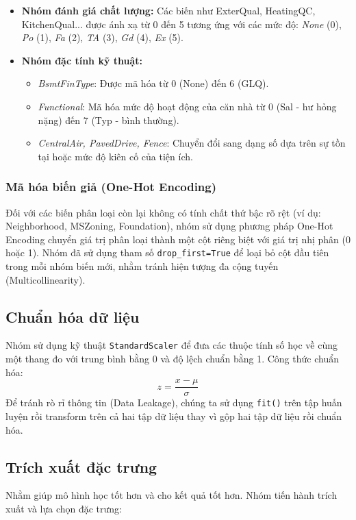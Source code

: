 \begin{itemize}
    \item[-] \textbf{Nhóm đánh giá chất lượng:} Các biến như ExterQual, HeatingQC, KitchenQual... được ánh xạ từ 0 đến 5 tương ứng với các mức độ: \textit{None} (0), \textit{Po} (1), \textit{Fa} (2), \textit{TA} (3), \textit{Gd} (4), \textit{Ex} (5).
    \item[-] \textbf{Nhóm đặc tính kỹ thuật:}
    \begin{itemize}
        \item[+] \textit{BsmtFinType}: Được mã hóa từ 0 (None) đến 6 (GLQ).
        \item[+] \textit{Functional}: Mã hóa mức độ hoạt động của căn nhà từ 0 (Sal - hư hỏng nặng) đến 7 (Typ - bình thường).
        \item[+] \textit{CentralAir, PavedDrive, Fence}: Chuyển đổi sang dạng số dựa trên sự tồn tại hoặc mức độ kiên cố của tiện ích.
    \end{itemize}
\end{itemize}

\subsubsection{Mã hóa biến giả (One-Hot Encoding)}
\indent Đối với các biến phân loại còn lại không có tính chất thứ bậc rõ rệt (ví dụ: Neighborhood, MSZoning, Foundation), nhóm sử dụng phương pháp One-Hot Encoding chuyển giá trị phân loại thành một cột riêng biệt với giá trị nhị phân (0 hoặc 1). Nhóm đã sử dụng tham số \texttt{drop\_first=True} để loại bỏ cột đầu tiên trong mỗi nhóm biến mới, nhằm tránh hiện tượng đa cộng tuyến (Multicollinearity).
\subsection{Chuẩn hóa dữ liệu}
\indent Nhóm sử dụng kỹ thuật \texttt{StandardScaler} để đưa các thuộc tính số học về cùng một thang đo với trung bình bằng 0 và độ lệch chuẩn bằng 1. Công thức chuẩn hóa:
\begin{equation}
z = \frac{x - \mu}{\sigma}
\end{equation}
Để tránh rò rỉ thông tin (Data Leakage), chúng ta sử dụng \texttt{fit()} trên tập huấn luyện rồi transform trên cả hai tập dữ liệu thay vì gộp hai tập dữ liệu rồi chuẩn hóa.
\subsection{Trích xuất đặc trưng}
Nhằm giúp mô hình học tốt hơn và cho kết quả tốt hơn. Nhóm tiến hành trích xuất và lựa chọn đặc trưng:

